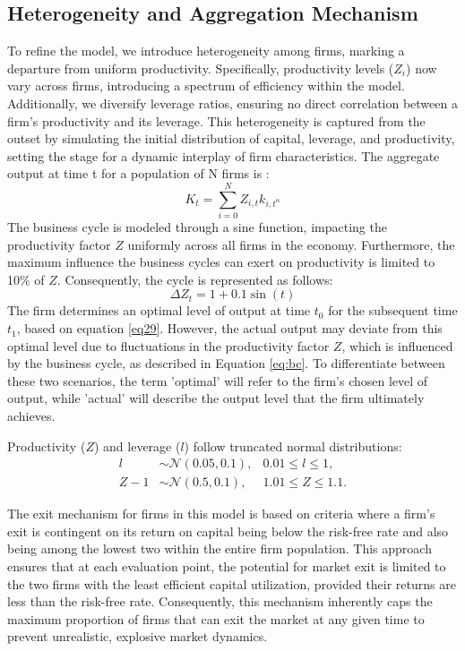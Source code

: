 \documentclass[12pt]{report}
\begin{document}
\subsection{Heterogeneity and Aggregation Mechanism}

To refine the model, we introduce heterogeneity among firms, marking a departure from uniform productivity.
Specifically, productivity levels (\( Z_i \)) now vary across firms, introducing a spectrum of efficiency within
the model. Additionally, we diversify leverage ratios, ensuring no direct correlation between a firm's productivity and
its leverage. This heterogeneity is captured from the outset by simulating the initial distribution of capital,
leverage, and productivity, setting the stage for a dynamic interplay of firm characteristics. The aggregate output at
time t for a population of N firms
is :
\begin{equation}
    K_t = \sum_{i=0}^{N}{Z_{i,t}k_{i,t^\alpha}} \label{eq:K_bar}
\end{equation}
The business cycle is modeled through a sine function, impacting the productivity factor \(Z\) uniformly across all
firms in the economy. Furthermore, the maximum influence the business cycles can exert on productivity is limited to 10\%
of \(Z\). Consequently, the cycle is represented as follows: 
\begin{equation}
    \Delta Z_t = 1 + 0.1 \sin(t) \label{eq:bc}
\end{equation}
The firm determines an optimal level of output at time \(t_0\) for the subsequent time \(t_1\), based on equation
\ref{eq29}. However, the actual output may deviate from this optimal level due to fluctuations in the productivity
factor \(Z\), which is influenced by the business cycle, as described in Equation \ref{eq:bc}. To differentiate
between these two scenarios, the term 'optimal' will refer to the firm's chosen level of output, while 'actual' will
describe the output level that the firm ultimately achieves. 

Productivity (\(Z\)) and leverage (\(l\)) follow truncated normal distributions:
\begin{align}
    l &\sim \mathcal{N}(0.05, 0.1), & 0.01 \leq l \leq 1, \\
    Z-1 &\sim \mathcal{N}(0.5, 0.1), & 1.01 \leq Z \leq 1.1.
\end{align}


The exit mechanism for firms in this model is based on criteria where a firm's exit is contingent on its return on
capital being below the risk-free rate and also being among the lowest two within the entire firm population. This
approach ensures that at each evaluation point, the potential for market exit is limited to the two firms with the least
efficient capital utilization, provided their returns are less than the risk-free rate. Consequently, this mechanism
inherently caps the maximum proportion of firms that can exit the market at any given time to prevent unrealistic,
explosive market dynamics.
\end{document}
